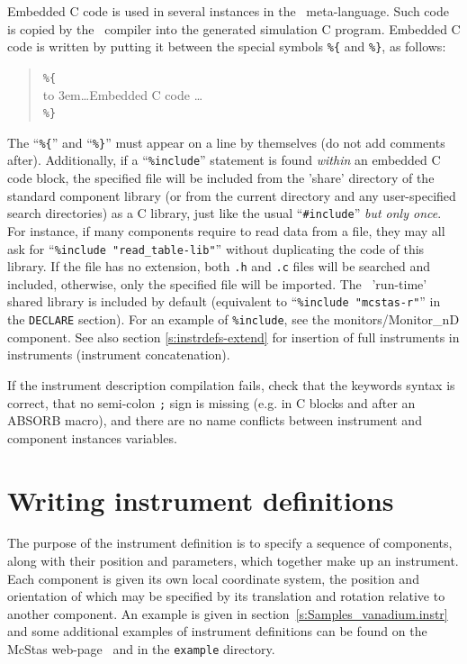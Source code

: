 Embedded C code is used in several instances in the \MCS\
meta-language. Such code is copied by the \MCS\ compiler into the
generated simulation C program. Embedded C code is written by putting it
between the special symbols \verb|%{| and \verb|%}|, as follows:
\begin{quote}
  \verb|%{| \\
  \hbox to 3em{}\ldots Embedded C code \ldots \\
  \verb|%}|
\end{quote} 
The ``\verb|%{|'' and ``\verb|%}|'' must appear on a line by themselves (do not add comments after).
Additionally, if a ``\verb+%include+'' statement is found \emph{within} an embedded C code block, the specified file will be included from the 'share' directory of the standard component library  (or from the
current directory and any user-specified search directories) as a C library, just like the usual ``\verb+#include+'' \emph{but only once}. For instance, if many components require to read data from a file, they may all ask for ``\verb+%include "read_table-lib"+''  without duplicating the code of this library. If the file has no extension, both \verb+.h+ and \verb+.c+ files will be searched and included, otherwise, only the specified file will be imported. The \MCS\ 'run-time' shared
library is included by default (equivalent to ``\verb+%include "mcstas-r"+'' in the \texttt{DECLARE} section). \index{Library!Run-time}
For an
example of \texttt{\%include}, see the monitors/Monitor\_nD component. See also section \ref{s:instrdefs-extend} for insertion of full instruments in instruments (instrument concatenation).

If the instrument description compilation fails, check that the
keywords syntax is correct, that no semi-colon \verb+;+ sign is
missing (e.g. in C blocks and after an ABSORB macro), and there are no name conflicts between instrument and component instances variables.


\section{Writing instrument definitions}
\label{s:instrdefs}

The purpose of the instrument definition is to specify a sequence of
components, along with their position and parameters, which together
make up an instrument. Each component is given its own local coordinate
system, the position and orientation of which may be specified by its
translation and rotation relative to another component. An example is
given in section~\ref{s:Samples_vanadium.instr} and some additional
examples of instrument definitions can be found on the McStas
web-page~\cite{mcstas_webpage} and in the \texttt{example} directory.


